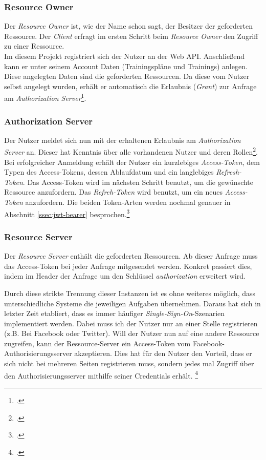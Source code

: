 \subsubsection*{Resource Owner}
Der \textit{Resource Owner} ist, wie der Name schon sagt, der Besitzer der geforderten Ressource. Der \textit{Client} erfragt im ersten Schritt beim \textit{Resource Owner} den Zugriff zu einer Ressource.\\
Im diesem Projekt registriert sich der Nutzer an der Web \ac{API}. Anschließend kann er unter seinem Account Daten (Trainingspläne und Trainings) anlegen. Diese angelegten Daten sind die geforderten Ressourcen. Da diese vom Nutzer selbst angelegt wurden, erhält er automatisch die Erlaubnis (\textit{Grant}) zur Anfrage am \textit{Authorization Server}\footcite{online:Implemented_OAuth_WebToken}.
\subsubsection*{Authorization Server}
\label{sssec:authorization-server}
Der Nutzer meldet sich nun mit der erhaltenen Erlaubnis am \textit{Authorization Server} an. Dieser hat Kenntnis über alle vorhandenen Nutzer und deren Rollen\footcite{online:Implemented_OAuth_Roles}. Bei erfolgreicher Anmeldung erhält der Nutzer ein kurzlebiges \textit{Access-Token}, dem Typen des Access-Tokens, dessen Ablaufdatum und ein langlebiges \textit{Refresh-Token}. Das Access-Token wird im nächsten Schritt benutzt, um die gewünschte Ressource anzufordern. Das \textit{Refreh-Token} wird benutzt, um ein neues \textit{Access-Token} anzufordern. Die beiden Token-Arten werden nochmal genauer in Abschnitt \ref{ssec:jwt-bearer} besprochen.\footcite[S. 287]{book:AngularJs:Steyer2015} 
\subsubsection*{Resource Server}
Der \textit{Resource Server} enthält die geforderten Ressourcen. Ab dieser Anfrage muss das Access-Token bei jeder Anfrage mitgesendet werden. Konkret passiert dies, indem im Header der Anfrage um den Schlüssel \textit{authorization} erweitert wird.

Durch diese strikte Trennung dieser Instanzen ist es ohne weiteres möglich, dass unterschiedliche Systeme die jeweiligen Aufgaben übernehmen. Daraus hat sich in letzter Zeit etabliert, dass es immer häufiger \textit{Single-Sign-On}-Szenarien implementiert werden. Dabei muss ich der Nutzer nur an einer Stelle registrieren (z.B. Bei Facebook oder Twitter). Will der Nutzer nun auf eine andere Ressource zugreifen, kann der Ressource-Server ein Access-Token vom Facebook-Authorisierungsserver akzeptieren. Dies hat für den Nutzer den Vorteil, dass er sich nicht bei mehreren Seiten registrieren muss, sondern jedes mal Zugriff über den Authorisierungsserver mithilfe seiner Credentials erhält. \footcite[S. 294]{book:AngularJs:Steyer2015} 
